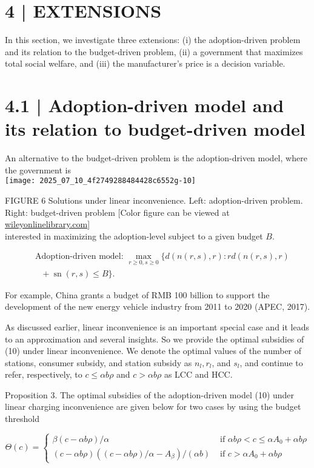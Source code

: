 \documentclass[10pt]{article}
\begin{document}
\section*{4 | EXTENSIONS}
In this section, we investigate three extensions: (i) the adoption-driven problem and its relation to the budget-driven problem, (ii) a government that maximizes total social welfare, and (iii) the manufacturer's price is a decision variable.

\section*{4.1 | Adoption-driven model and its relation to budget-driven model}
An alternative to the budget-driven problem is the adoption-driven model, where the government is\\
\texttt{[image: 2025\_07\_10\_4f2749288484428c6552g-10]}

FIGURE 6 Solutions under linear inconvenience. Left: adoption-driven problem. Right: budget-driven problem [Color figure can be viewed at \href{http://wileyonlinelibrary.com}{wileyonlinelibrary.com}]\\
interested in maximizing the adoption-level subject to a given budget $B$.


\begin{align*}
& \text { Adoption-driven model: } \max _{r \geq 0, s \geq 0}\{d(n(r, s), r): r d(n(r, s), r) \\
& \quad+\operatorname{sn}(r, s) \leq B\} . \tag{10}
\end{align*}


For example, China grants a budget of RMB 100 billion to support the development of the new energy vehicle industry from 2011 to 2020 (APEC, 2017).

As discussed earlier, linear inconvenience is an important special case and it leads to an approximation and several insights. So we provide the optimal subsidies of (10) under linear inconvenience. We denote the optimal values of the number of stations, consumer subsidy, and station subsidy as $n_{l}, r_{l}$, and $s_{l}$, and continue to refer, respectively, to $c \leq \alpha b \rho$ and $c>\alpha b \rho$ as LCC and HCC.

Proposition 3. The optimal subsidies of the adoption-driven model (10) under linear charging inconvenience are given below for two cases by using the budget threshold

\[
\Theta(c)= \begin{cases}\beta(c-\alpha b \rho) / \alpha & \text { if } \alpha b \rho<c \leq \alpha A_{0}+\alpha b \rho  \tag{11}\\ (c-\alpha b \rho)\left((c-\alpha b \rho) / \alpha-A_{\beta}\right) /(\alpha b) & \text { if } c>\alpha A_{0}+\alpha b \rho\end{cases}
\]
\end{document}
